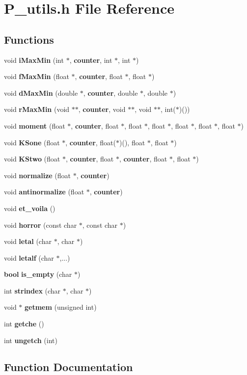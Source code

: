 \section{P\_\-utils.h File Reference}
\label{P__utils_8h}
\subsection*{Functions}
\begin{CompactItemize}
\item 
void {\bf i\-Max\-Min} (int $\ast$, {\bf counter}, int $\ast$, int $\ast$)
\item 
void {\bf f\-Max\-Min} (float $\ast$, {\bf counter}, float $\ast$, float $\ast$)
\item 
void {\bf d\-Max\-Min} (double $\ast$, {\bf counter}, double $\ast$, double $\ast$)
\item 
void {\bf r\-Max\-Min} (void $\ast$$\ast$, {\bf counter}, void $\ast$$\ast$, void $\ast$$\ast$, int($\ast$)())
\item 
void {\bf moment} (float $\ast$, {\bf counter}, float $\ast$, float $\ast$, float $\ast$, float $\ast$, float $\ast$, float $\ast$)
\item 
void {\bf KSone} (float $\ast$, {\bf counter}, float($\ast$)(), float $\ast$, float $\ast$)
\item 
void {\bf KStwo} (float $\ast$, {\bf counter}, float $\ast$, {\bf counter}, float $\ast$, float $\ast$)
\item 
void {\bf normalize} (float $\ast$, {\bf counter})
\item 
void {\bf antinormalize} (float $\ast$, {\bf counter})
\item 
void {\bf et\_\-voila} ()
\item 
void {\bf horror} (const char $\ast$, const char $\ast$)
\item 
void {\bf letal} (char $\ast$, char $\ast$)
\item 
void {\bf letalf} (char $\ast$,...)
\item 
{\bf bool} {\bf is\_\-empty} (char $\ast$)
\item 
int {\bf strindex} (char $\ast$, char $\ast$)
\item 
void $\ast$ {\bf getmem} (unsigned int)
\item 
int {\bf getche} ()
\item 
int {\bf ungetch} (int)
\end{CompactItemize}


\subsection{Function Documentation}
